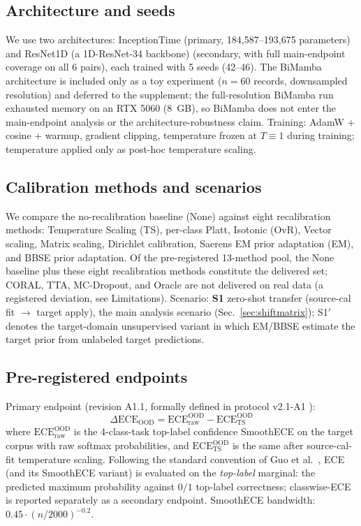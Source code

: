 \documentclass[review,12pt,nonatbib]{elsarticle}
\begin{document}
\subsection{Architecture and seeds}
We use two architectures: InceptionTime (primary, 184{,}587--193{,}675
parameters) and ResNet1D (a 1D-ResNet-34 backbone) (secondary, with full
main-endpoint coverage on all 6 pairs), each trained with 5 seeds
(42--46). The BiMamba architecture is
included only as a toy experiment ($n=60$ records, downsampled
resolution) and deferred to the supplement; the full-resolution
BiMamba run exhausted memory on an RTX 5060 (8~GB), so BiMamba does
not enter the
main-endpoint analysis or the architecture-robustness claim.
Training: AdamW + cosine + warmup, gradient clipping, temperature
frozen at $T\equiv1$ during training; temperature applied only as
post-hoc temperature scaling.

\subsection{Calibration methods and scenarios}
We compare the no-recalibration baseline (None) against eight
recalibration methods: Temperature Scaling (TS), per-class Platt,
Isotonic (OvR), Vector scaling, Matrix scaling, Dirichlet calibration,
Saerens EM prior adaptation (EM), and BBSE prior adaptation.
Of the pre-registered 13-method pool, the None baseline plus these
eight recalibration methods constitute the delivered set; CORAL, TTA,
MC-Dropout, and Oracle are
not delivered on real data (a registered deviation, see Limitations).
Scenario: \textbf{S1} zero-shot transfer (source-cal fit
$\rightarrow$ target apply), the main analysis scenario
(Sec.~\ref{sec:shiftmatrix}); S1$'$ denotes the target-domain unsupervised
variant in which EM/BBSE estimate the target prior from unlabeled
target predictions.

\subsection{Pre-registered endpoints}
\label{sec:prereg}
Primary endpoint (revision A1.1, formally defined in
protocol v2.1-A1 \cite{protocolv21a1}):
\begin{equation}
    \Delta\text{ECE}_{\text{OOD}}
    = \text{ECE}_{\mathrm{raw}}^{\mathrm{OOD}} - \text{ECE}_{\mathrm{TS}}^{\mathrm{OOD}}
\end{equation}
where $\text{ECE}_{\mathrm{raw}}^{\mathrm{OOD}}$ is the 4-class-task top-label
confidence SmoothECE on
the target corpus with raw softmax probabilities, and
$\text{ECE}_{\mathrm{TS}}^{\mathrm{OOD}}$ is the same after source-cal-fit temperature
scaling. Following the standard convention of Guo et al.\
\cite{guo2017calibration}, ECE (and its SmoothECE variant) is evaluated on
the \emph{top-label} marginal: the predicted maximum probability against
$0/1$ top-label correctness; classwise-ECE is reported separately as a
secondary endpoint. SmoothECE bandwidth: $0.45\cdot(n/2000)^{-0.2}$.
\end{document}
